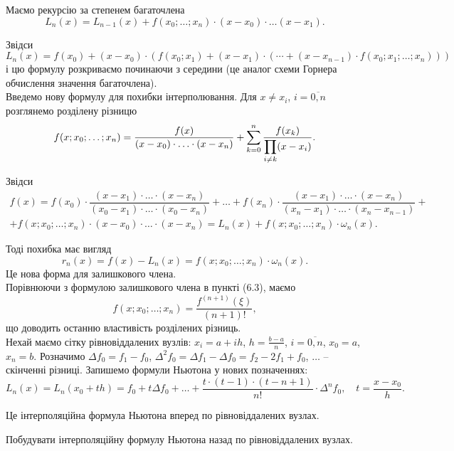 Маємо рекурсію за степенем багаточлена 
\[ L_n(x) = L_{n-1}(x) + f(x_0;\ldots;x_n)\cdot(x-x_0)\cdot\ldots(x-x_1).\]

Звідси \[L_n(x) = f(x_0) + (x-x_0)\cdot(f(x_0;x_1)+(x-x_1)\cdot(\cdots+(x-x_{n-1})\cdot f(x_0;x_1;\ldots;x_n)))\] і цю формулу розкриваємо починаючи з середини (це аналог схеми Горнера обчислення значення багаточлена). \\

Введемо нову формулу для похибки інтерполювання. Для $x \ne x_i$, $i = \overline{0,n}$ розглянемо розділену різницю
\[ f(x;x_0;\ldots;x_n) = \dfrac{f(x)}{(x-x_0)\cdot\ldots\cdot(x-x_n)} + \displaystyle\sum\limits_{k=0}^n \dfrac{f(x_k)}{\displaystyle\prod\limits_{i\ne k}(x-x_i)}.\]

Звідси
\begin{multline*}
    f(x) = f(x_0) \cdot \dfrac{(x-x_1)\cdot\ldots\cdot(x-x_n)}{(x_0-x_1)\cdot\ldots\cdot(x_0-x_n)} + \ldots + f(x_n) \cdot \dfrac{(x-x_1)\cdot\ldots\cdot(x-x_n)}{(x_n-x_1)\cdot\ldots\cdot(x_n-x_{n-1})} + \\
    + f(x;x_0;\ldots;x_n)\cdot(x-x_0)\cdot\ldots\cdot(x-x_n)=L_n(x)+f(x;x_0;\ldots;x_n)\cdot\omega_n(x).
\end{multline*}

Тоді похибка має вигляд
\begin{equation}
    \label{eq:6.19}
    r_n(x) = f(x) - L_n(x) = f(x;x_0;\ldots;x_n)\cdot\omega_n(x).
\end{equation}
Це нова форма для залишкового члена.\\

Порівнюючи з формулою залишкового члена в пункті (6.3), маємо
\[ f(x;x_0;\ldots;x_n) = \dfrac{f^{(n+1)}(\xi)}{(n+1)!},\]
що доводить останню властивість розділених різниць. \\

Нехай маємо сітку рівновіддалених вузлів: $x_i = a + i h$, $h = \frac{b-a}{n}$, $i = \overline{0, n}$, $x_0 = a$, $x_n = b$. Розначимо $\Delta f_0 = f_1 - f_0$, $\Delta^2f_0 = \Delta f_1 - \Delta f_0 = f_2 - 2 f_1 + f_0$, $\ldots$ -- скінченні різниці. Запишемо формули Ньютона у нових позначеннях:
\[ L_n(x) = L_n(x_0 + t h) = f_0 + t \Delta f_0 + \ldots + \dfrac{t\cdot(t-1)\cdot(t-n+1)}{n!}\cdot \Delta^n f_0, \quad t = \dfrac{x-x_0}{h}.\]

Це інтерполяційна формула Ньютона вперед по рівновіддалених вузлах.

\begin{problem}
    Побудувати інтерполяційну формулу Ньютона назад по рівновіддалених вузлах.
\end{problem}

